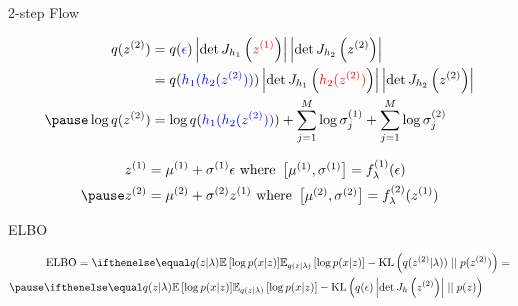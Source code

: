 \documentclass[14pt]{beamer}
\begin{document}
\begin{frame}{2-step Flow}
\begin{small}
\begin{equation*}
\begin{aligned}
q(z^{(2)}) &= q(\textcolor{blue}{\epsilon})\djac{h_{1}}{\textcolor{red}{z^{(1)}}}\djac{h_{2}}{z^{(2)}} \\
&= q(\textcolor{blue}{h_{1}(h_{2}(z^{(2)}))})\djac{h_{1}}{\textcolor{red}{h_{2}(z^{(2)})}}\djac{h_{2}}{z^{(2)}} \\ \pause
\log q(z^{(2)}) &= \log q(\textcolor{blue}{h_{1}(h_{2}(z^{(2)}))}) + \sum_{j=1}^{M}\log\sigma^{(1)}_{j} + \sum_{j=1}^{M}\log\sigma^{(2)}_{j}
\end{aligned}
\end{equation*}
\end{small}
\pause
\begin{equation*}
\begin{aligned}
z^{(1)} &= \mu^{(1)} + \sigma^{(1)}\epsilon \text{ where } \begin{bmatrix}\mu^{(1)}, \sigma^{(1)}\end{bmatrix} = f^{(1)}_{\lambda}(\epsilon) \\ \pause
z^{(2)} &= \mu^{(2)} + \sigma^{(2)}z^{(1)} \text{ where } \begin{bmatrix}\mu^{(2)}, \sigma^{(2)}\end{bmatrix} = f^{(2)}_{\lambda}(z^{(1)})
\end{aligned}
\end{equation*}
\end{frame}

\begin{frame}{ELBO}
\begin{small}
\begin{equation*}
\begin{aligned}
&\ELBO = \E[q(z|\lambda)]{\log p(x|z)} - \KL{q(z^{(2)}|\lambda))}{p(z^{(2)})} = \\ \pause
&\E[q(z|\lambda)]{\log p(x|z)} - \KL{q(\epsilon)\djac{h}{z^{(2)}}}{p(z)}
\end{aligned}
\end{equation*}
\end{small}
\end{frame}
\end{document}
